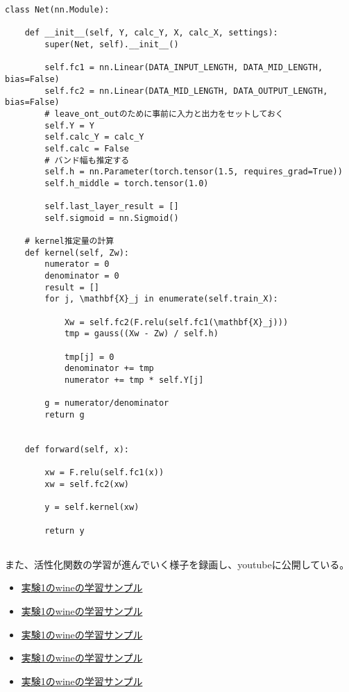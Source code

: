 \begin{lstlisting}[caption=Pytorchを用いたK-AFの計算用のクラス,label=python_impl]
class Net(nn.Module):

    def __init__(self, Y, calc_Y, X, calc_X, settings):
        super(Net, self).__init__()

        self.fc1 = nn.Linear(DATA_INPUT_LENGTH, DATA_MID_LENGTH, bias=False)
        self.fc2 = nn.Linear(DATA_MID_LENGTH, DATA_OUTPUT_LENGTH, bias=False)
        # leave_ont_outのために事前に入力と出力をセットしておく
        self.Y = Y
        self.calc_Y = calc_Y
        self.calc = False
        # バンド幅も推定する
        self.h = nn.Parameter(torch.tensor(1.5, requires_grad=True))
        self.h_middle = torch.tensor(1.0)

        self.last_layer_result = []
        self.sigmoid = nn.Sigmoid()

    # kernel推定量の計算
    def kernel(self, Zw):
        numerator = 0
        denominator = 0
        result = []
        for j, \mathbf{X}_j in enumerate(self.train_X):

            Xw = self.fc2(F.relu(self.fc1(\mathbf{X}_j)))
            tmp = gauss((Xw - Zw) / self.h)

            tmp[j] = 0
            denominator += tmp
            numerator += tmp * self.Y[j]

        g = numerator/denominator
        return g


    def forward(self, x):

        xw = F.relu(self.fc1(x))
        xw = self.fc2(xw)

        y = self.kernel(xw)

        return y


\end{lstlisting}

また、活性化関数の学習が進んでいく様子を録画し、youtubeに公開している。



\begin{itemize}
  \item \href{https://github.com/latte0/graduation\_thesis}{実験1のwineの学習サンプル}
  \item \href{https://github.com/latte0/graduation\_thesis}{実験1のwineの学習サンプル}
  \item \href{https://github.com/latte0/graduation\_thesis}{実験1のwineの学習サンプル}
  \item \href{https://github.com/latte0/graduation\_thesis}{実験1のwineの学習サンプル}
  \item \href{https://github.com/latte0/graduation\_thesis}{実験1のwineの学習サンプル}
\end{itemize}

